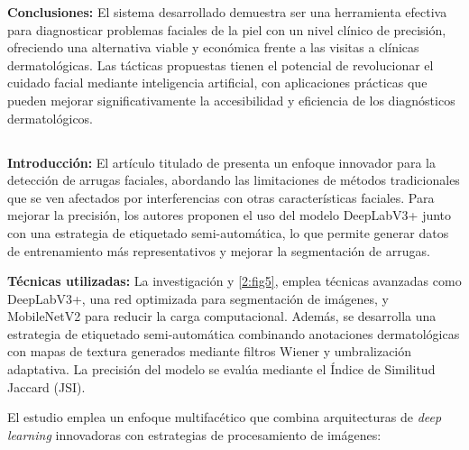\textbf{Conclusiones:}
El sistema desarrollado demuestra ser una herramienta efectiva para diagnosticar problemas faciales de la piel con un nivel clínico de precisión, ofreciendo una alternativa viable y económica frente a las visitas a clínicas dermatológicas. Las tácticas propuestas tienen el potencial de revolucionar el cuidado facial mediante inteligencia artificial, con aplicaciones prácticas que pueden mejorar significativamente la accesibilidad y eficiencia de los diagnósticos dermatológicos.



\subsection{}

\textbf{Introducción:}
El artículo titulado  de \cite{Zhong2024} presenta un enfoque innovador para la detección de arrugas faciales, abordando las limitaciones de métodos tradicionales que se ven afectados por interferencias con otras características faciales. Para mejorar la precisión, los autores proponen el uso del modelo DeepLabV3+ junto con una estrategia de etiquetado semi-automática, lo que permite generar datos de entrenamiento más representativos y mejorar la segmentación de arrugas.

\textbf{Técnicas utilizadas:}
La investigación y \ref{2:fig5}, emplea técnicas avanzadas como DeepLabV3+, una red optimizada para segmentación de imágenes, y MobileNetV2 para reducir la carga computacional. Además, se desarrolla una estrategia de etiquetado semi-automática combinando anotaciones dermatológicas con mapas de textura generados mediante filtros Wiener y umbralización adaptativa. La precisión del modelo se evalúa mediante el Índice de Similitud Jaccard (JSI).

El estudio emplea un enfoque multifacético que combina arquitecturas de \textit{deep learning} innovadoras con estrategias de procesamiento de imágenes:


